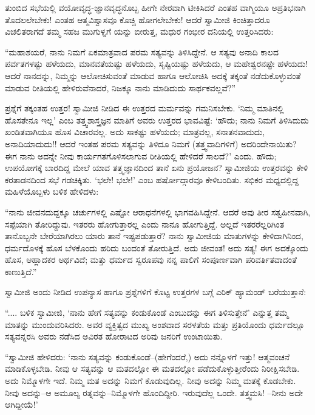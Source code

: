 ತುಂಬಿದ ಸಭೆಯಲ್ಲಿ ವಯೋವೃದ್ಧ-ಜ್ಞಾನವೃದ್ಧನೊಬ್ಬ ಹೀಗೇ ನೇರವಾಗಿ ಟೀಕಿಸಿದರೆ ಎಂತಹ ವಾಗ್ಮಿಯೂ ಅಪ್ರತಿಭನಾಗಿ ತೊದಲಲೇಬೇಕು! ಎಂತಹ ಆತ್ಮವಿಶ್ವಾಸವೂ ಕೊಚ್ಚಿ ಹೋಗಲೇಬೇಕು! ಆದರೆ ಸ್ವಾಮೀಜಿ ಕಿಂಚಿತ್ತಾದರೂ ವಿಚಲಿತರಾಗದೆ ತಮ್ಮ ಸಹಜ ಮುಗುಳ್ನಗೆ ಯನ್ನು ಬೀರುತ್ತ, ಮಧುರ ಗಂಭೀರ ದನಿಯಲ್ಲಿ ಉತ್ತರಿಸಿದರು:

“ಮಹಾಶಯರೆ, ನಾನು ನಿಮಗೆ ಏಕಮಾತ್ರವಾದ ಪರಮ ಸತ್ಯವನ್ನು ತಿಳಿಸಿದ್ದೇನೆ. ಆ ಸತ್ಯವು ಅನಾದಿ ಕಾಲದ ಪರ್ವತಗಳಷ್ಟು ಹಳೆಯದು, ಮಾನವತೆಯಷ್ಟು ಹಳೆಯದು, ಸೃಷ್ಟಿಯಷ್ಟು ಹಳೆಯದು, ಆ ಮಹೇಶ್ವರನಷ್ಟೇ ಹಳೆಯದು! ಆದರೆ ನಾನದನ್ನು, ನಿಮ್ಮನ್ನು ಆಲೋಚಿಸುವಂತೆ ಮಾಡುವ ಹಾಗೂ ಆಲೋಚಿಸಿ ಅದಕ್ಕೆ ತಕ್ಕಂತೆ ನಡೆದುಕೊಳ್ಳುವಂತೆ ಮಾಡುವ ರೀತಿಯಲ್ಲಿ ಹೇಳಿರುವೆನಾದರೆ, ನಿಜಕ್ಕೂ ನಾನು ಮಾಡಿದುದು ಸಾರ್ಥಕವಲ್ಲವೆ?”

ಪ್ರಶ್ನೆಗೆ ತಕ್ಕಂತಹ ಉತ್ತರ! ಸ್ವಾಮೀಜಿ ನೀಡಿದ ಈ ಉತ್ತರದ ಮರ್ಮವನ್ನು ಗಮನಿಸಬೇಕು. ‘ನಿಮ್ಮ ಮಾತಿನಲ್ಲಿ ಹೊಸತೇನೂ ಇಲ್ಲ’ ಎಂಬ ತತ್ತ್ವಶಾಸ್ತ್ರಜ್ಞನ ಮಾತಿಗೆ ಅವರು ಉತ್ತರದ ಭಾವವಿಷ್ಟೆ: ‘ಹೌದು; ನಾನು ನಿಮಗೆ ತಿಳಿಸಿದುದು ಖಂಡಿತವಾಗಿಯೂ ಹೊಸ ವಿಚಾರವಲ್ಲ. ಅದು ಸಾಕಷ್ಟು ಹಳೆಯದು; ಮಾತ್ರವಲ್ಲ, ಸನಾತನವಾದುದು, ಅನಾದಿಯಾದುದು!! ಆದರೆ ಇಂತಹ ಪರಮ ಸತ್ಯವನ್ನು ತಿಳಿದೂ ನಿಮಗೆ (ತತ್ತ್ವವಾದಿಗಳಿಗೆ) ಅದರಿಂದೇನಾಯಿತು? ಈಗ ನಾನು ಅದನ್ನೇ ನೀವು ಕಾರ್ಯಗತಗೊಳಿಸಲಾಗುವ ರೀತಿಯಲ್ಲಿ ಹೇಳಿದರೆ ಸಾಲದೆ?’ ಎಂದು. ಹೌದು; ಉಪಯೋಗಕ್ಕೆ ಬಾರದಿದ್ದ ಮೇಲೆ ಯಾವ ತತ್ತ್ವಜ್ಞಾನದಿಂದ ತಾನೆ ಏನು ಪ್ರಯೋಜನ? ಸ್ವಾಮೀಜಿಯ ಉತ್ತರವನ್ನು ಕೇಳಿ ಕರತಾಡನದಿಂದ ಸಭೆ ಗಡಚಿಕ್ಕಿತು. ‘ಭಲೇ! ಭಲೇ!’ ಎಂಬ ಹರ್ಷೋದ್ಗಾರವೂ ಕೇಳಿಬಂದಿತು. ಸಭಿಕರ ಮಧ್ಯದಲ್ಲಿದ್ದ ಮಹಿಳೆಯೊಬ್ಬಳು ಬಳಿಕ ಹೇಳಿದಳು:

“ನಾನು ಜೀವನದುದ್ದಕ್ಕೂ ಚರ್ಚುಗಳಲ್ಲಿ ಎಷ್ಟೋ ಆರಾಧನೆಗಳಲ್ಲಿ ಭಾಗವಹಿಸಿದ್ದೇನೆ. ಆದರೆ ಅವು ತೀರ ಸತ್ವಹೀನವಾಗಿ, ಸಪ್ಪೆಯಾಗಿ ತೋರಿದ್ದುವು. ಇತರರು ಹೋಗುತ್ತಾರಲ್ಲ ಎಂದು ನಾನೂ ಹೋಗುತ್ತಿದ್ದೆ. ಅಲ್ಲದೆ ಇತರರೆಲ್ಲರಿಗಿಂತ ತಾನೊಬ್ಬನೇ ಬೇರೆಯಾಗಿರಲು ಯಾರು ತಾನೆ ಇಷ್ಟಪಡುತ್ತಾರೆ? ನಾನು ಸ್ವಾಮೀಜಿಯ ಮಾತುಗಳನ್ನು ಕೇಳಿದಾಗಿನಿಂದ, ಧರ್ಮದೊಳಕ್ಕೆ ಹೊಸ ಬೆಳಕೊಂದು ಹರಿದು ಬಂದಂತೆ ತೋರುತ್ತಿದೆ. ಅದು ಜೀವಂತ! ಅದು ಸತ್ಯ! ಈಗ ಅದಕ್ಕೊಂದು ಹೊಸ, ಆಹ್ಲಾದಕರ ಅರ್ಥವಿದೆ; ಮತ್ತು ಧರ್ಮದ ಸ್ವರೂಪವು ನನ್ನ ಪಾಲಿಗೆ ಸಂಪೂರ್ಣವಾಗಿ ಪರಿವರ್ತಿತವಾದಂತೆ ಕಾಣುತ್ತಿದೆ.”

ಸ್ವಾಮೀಜಿ ಅಂದು ನೀಡಿದ ಉಪನ್ಯಾಸ ಹಾಗೂ ಪ್ರಶ್ನೆಗಳಿಗೆ ಕೊಟ್ಟ ಉತ್ತರಗಳ ಬಗ್ಗೆ ಎರಿಕ್ ಹ್ಯಾಮಂಡ್ ಬರೆಯುತ್ತಾನೆ:

“.... ಬಳಿಕ ಸ್ವಾಮೀಜಿ, ‘ನಾನು ಹೇಗೆ ಸತ್ಯವನ್ನು ಕಂಡುಕೊಂಡೆ ಎಂಬುದನ್ನು ಈಗ ತಿಳಿಸುತ್ತೇನೆ’ ಎನ್ನುತ್ತ ತಮ್ಮ ಮಾತನ್ನು ಮುಂದುವರಿಸಿದರು. ಅವರ ವ್ಯಕ್ತಿತ್ವದ ಮುಖ್ಯ ಅಂಶವಾದ ಸರಳತೆಯ ಮತ್ತು ಪ್ರತಿಯೊಂದು ಧರ್ಮದಲ್ಲೂ ಸತ್ಯವನ್ನರಸಿ ಅವರು ನಡೆಸಿದ ಅವಿರತ ಹೋರಾಟದ ಅರಿವು ಜನರಿಗೆ ಉಂಟಾಯಿತು.

“ಸ್ವಾಮೀಜಿ ಹೇಳಿದರು: ‘ನಾನು ಸತ್ಯವನ್ನು ಕಂಡುಕೊಂಡೆ–(ಹೇಗೆಂದರೆ,) ಅದು ನನ್ನೊಳಗೆ ಇತ್ತು! ಆತ್ಮವಂಚನೆ ಮಾಡಿಕೊಳ್ಳಬೇಡಿ. ನೀವು ಆ ಸತ್ಯವನ್ನು ಆ ಮತದಲ್ಲೋ ಈ ಮತದಲ್ಲೋ ಪಡೆದುಕೊಳ್ಳುತ್ತೀರೆಂದು ನಿರೀಕ್ಷಿಸಬೇಡಿ. ಅದು ನಿಮ್ಮೊಳಗೇ ಇದೆ. ನಿಮ್ಮ ಮತ ಅದನ್ನು ನಿಮಗೆ ಕೊಡುವುದಿಲ್ಲ. ನೀವು ಅದನ್ನು ನಿಮ್ಮ ಮತಕ್ಕೆ ಕೊಡಬೇಕು. ನೀವು ಅದನ್ನು–ಆ ಅಮೂಲ್ಯ ರತ್ನವನ್ನು–ನಿಮ್ಮೊಳಗೇ ಹೊಂದಿದ್ದೀರಿ. ಇರುವುದೆಲ್ಲ ಒಂದೇ. ತತ್ತ್ವಮಸಿ! –ನೀನು ಅದೇ ಆಗಿದ್ದೀಯೆ!’

